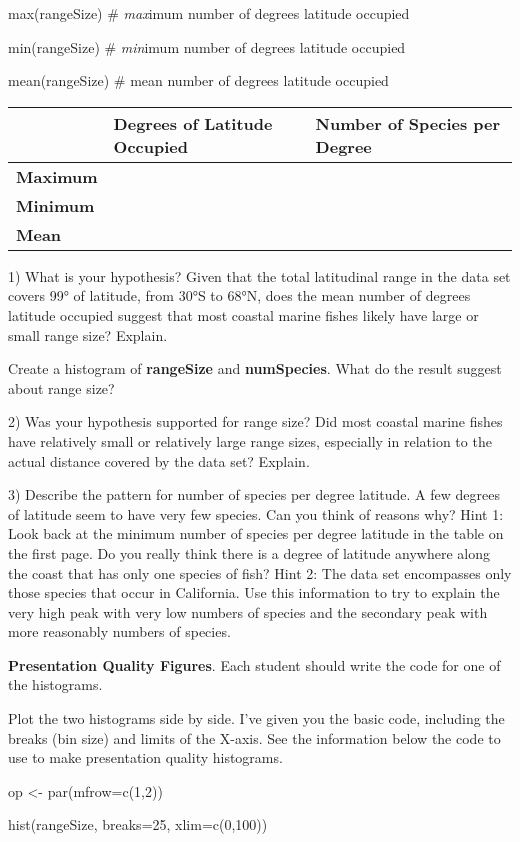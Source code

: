 max(rangeSize) \# \emph{max}imum number of degrees latitude occupied

min(rangeSize) \# \emph{min}imum number of degrees latitude occupied

mean(rangeSize) \# mean number of degrees latitude occupied

\begin{longtable}[c]{@{}lll@{}}
\toprule
& \textbf{Degrees of Latitude Occupied} & \textbf{Number of Species per
Degree}\tabularnewline
\midrule
\endhead
\textbf{Maximum} & &\tabularnewline
\textbf{Minimum} & &\tabularnewline
\textbf{Mean} & &\tabularnewline
\bottomrule
\end{longtable}

1) What is your hypothesis? Given that the total latitudinal range in
the data set covers 99° of latitude, from 30°S to 68°N, does the mean
number of degrees latitude occupied suggest that most coastal marine
fishes likely have large or small range size? Explain.

Create a histogram of \textbf{rangeSize} and \textbf{numSpecies}. What
do the result suggest about range size?

2) Was your hypothesis supported for range size? Did most coastal marine
fishes have relatively small or relatively large range sizes, especially
in relation to the actual distance covered by the data set? Explain.

3) Describe the pattern for number of species per degree latitude. A few
degrees of latitude seem to have very few species. Can you think of
reasons why? Hint 1: Look back at the minimum number of species per
degree latitude in the table on the first page. Do you really think
there is a degree of latitude anywhere along the coast that has only one
species of fish? Hint 2: The data set encompasses only those species
that occur in California. Use this information to try to explain the
very high peak with very low numbers of species and the secondary peak
with more reasonably numbers of species.

\textbf{Presentation Quality Figures}. Each student should write the
code for one of the histograms.

Plot the two histograms side by side. I've given you the basic code,
including the breaks (bin size) and limits of the X-axis. See the
information below the code to use to make presentation quality
histograms.

op \textless{}- par(mfrow=c(1,2))

hist(rangeSize, breaks=25, xlim=c(0,100))

